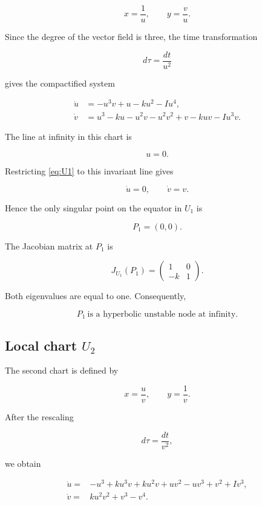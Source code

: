 \documentclass[11pt,reqno]{amsart}
\theoremstyle{plain}
\theoremstyle{definition}
\theoremstyle{remark}
\begin{document}
\[
x=\frac{1}{u},\qquad y=\frac{v}{u}.
\]

Since the degree of the vector field is three, the time transformation

\[
d\tau=\frac{dt}{u^{2}}
\]

gives the compactified system

\begin{equation}
\label{eq:U1}
\begin{aligned}
\dot u&=-u^3v+u-ku^2-Iu^4,\\
\dot v&=u^3-ku-u^2v-u^2v^2+v-kuv-Iu^3v .
\end{aligned}
\end{equation}

The line at infinity in this chart is

\[
u=0 .
\]

Restricting \eqref{eq:U1} to this invariant line gives

\[
\dot u=0,\qquad
\dot v=v .
\]

Hence the only singular point on the equator in \(U_1\) is

\[
P_1=(0,0).
\]

The Jacobian matrix at \(P_1\) is

\[
J_{U_1}(P_1)
=
\begin{pmatrix}
1&0\\
-k&1
\end{pmatrix}.
\]

Both eigenvalues are equal to one. Consequently,

\[
\boxed{
P_1\ \text{is a hyperbolic unstable node at infinity}.
}
\]

\subsection{Local chart \(U_2\)}

The second chart is defined by

\[
x=\frac{u}{v},\qquad y=\frac1v .
\]

After the rescaling

\[
d\tau=\frac{dt}{v^2},
\]

we obtain

\begin{equation}
\label{eq:U2}
\begin{aligned}
\dot u={}&
-u^3+ku^3v+ku^2v+uv^2-uv^3+v^2+Iv^3,
\\
\dot v={}&
ku^2v^2+v^3-v^4 .
\end{aligned}
\end{equation}
\end{document}
